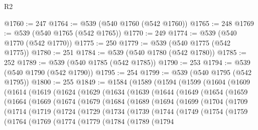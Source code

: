 \begin{lexlean}{R2}
\begin{coremodule}
@1760 := 247
@1764 := @539 (@540 @1760 (@542 @1760))
@1765 := 248
@1769 := @539 (@540 @1765 (@542 @1765))
@1770 := 249
@1774 := @539 (@540 @1770 (@542 @1770))
@1775 := 250
@1779 := @539 (@540 @1775 (@542 @1775))
@1780 := 251
@1784 := @539 (@540 @1780 (@542 @1780))
@1785 := 252
@1789 := @539 (@540 @1785 (@542 @1785))
@1790 := 253
@1794 := @539 (@540 @1790 (@542 @1790))
@1795 := 254
@1799 := @539 (@540 @1795 (@542 @1795))
@1800 := 255
@1849 := @1584
    (@1589
      (@1594
        (@1599
          (@1604
            (@1609
              (@1614
                (@1619
                  (@1624
                    (@1629
                      (@1634
                        (@1639
                          (@1644
                            (@1649
                              (@1654
                                (@1659
                                  (@1664
                                    (@1669
                                      (@1674
                                        (@1679
                                          (@1684
                                            (@1689
                                              (@1694
                                                (@1699
                                                  (@1704
                                                    (@1709
                                                      (@1714
                                                        (@1719
                                                          (@1724
                                                            (@1729
                                                              (@1734
                                                                (@1739
                                                                  (@1744
                                                                    (@1749
                                                                      (@1754
                                                                        (@1759
                                                                          (@1764
                                                                            (@1769
                                                                              (@1774
                                                                                (@1779
                                                                                  (@1784
                                                                                    (@1789
                                                                                      (@1794

\end{coremodule}
\end{lexlean}
